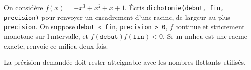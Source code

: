 On considère $f(x)=-x^3+x^2+x+1$. Écris \texttt{dichotomie(debut, fin, precision)} pour renvoyer un encadrement d'une racine, de largeur au plus \texttt{precision}. On suppose \texttt{debut < fin}, \texttt{precision > 0}, $f$ continue et strictement monotone sur l'intervalle, et $f(\texttt{debut})f(\texttt{fin})<0$. Si un milieu est une racine exacte, renvoie ce milieu deux fois.

La précision demandée doit rester atteignable avec les nombres flottants utilisés.
